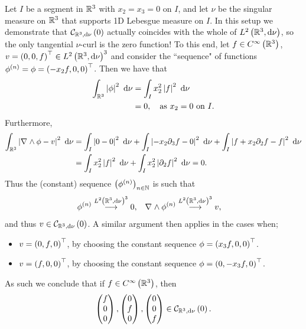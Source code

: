 Let $I$ be a segment in $\mathbb{R}^3$ with $x_2=x_3=0$ on $I$, and let $\nu$ be the singular measure on $\mathbb{R}^3$ that supports 1D Lebesgue measure on $I$.
In this setup we demonstrate that $\mathcal{C}_{ \mathbb{R}^3, \mathrm{d}\nu}\left( 0 \right)$ actually coincides with the whole of $L^{2}\left( \mathbb{R}^3,\mathrm{d}\nu \right)$, so the only tangential $\nu$-curl is the zero function!
To this end, let $f\in C^{\infty}\left( \mathbb{R}^3 \right)$, $v=\left( 0,0,f \right)^\top\in L^{2}\left( \mathbb{R}^3,\mathrm{d}\nu \right)^3$ and consider the ``sequence" of functions $\phi^{(n)}=\phi=\left( -x_2 f, 0, 0 \right)^\top$.
Then we have that
\begin{align*}
	\int_{\mathbb{R}^3}\left\lvert \phi \right\rvert^2 \ \mathrm{d}\nu &= \int_{I}x_2^2\left\lvert f \right\rvert^2 \ \mathrm{d}\nu \\
	&= 0, \quad \text{as } x_2=0 \text{ on } I.
\end{align*}
Furthermore,
\begin{align*}
	\int_{\mathbb{R}^3}\left\lvert \nabla_{}\wedge\phi - v \right\rvert^2 \ \mathrm{d}\nu &= \int_{I}\left\lvert 0-0 \right\rvert^2 \ \mathrm{d}\nu + \int_{I}\left\lvert -x_2\partial_3 f - 0 \right\rvert^2 \ \mathrm{d}\nu + \int_{I}\left\lvert f + x_2\partial_2 f - f \right\rvert^2 \ \mathrm{d}\nu \\
	&= \int_{I}x_2^2\left\lvert f \right\rvert^2 \ \mathrm{d}\nu + \int_{I}x_2^2\left\lvert \partial_2 f \right\rvert^2 \ \mathrm{d}\nu
	= 0.
\end{align*}
Thus the (constant) sequence $\left( \phi^{(n)} \right)_{n\in\mathbb{N}}$ is such that
\begin{align*}
	\phi^{(n)} \overset{L^{2}\left( \mathbb{R}^3,\mathrm{d}\nu \right)^3}{\longrightarrow} 0, &\quad \nabla_{}\wedge\phi^{(n)} \overset{L^{2}\left( \mathbb{R}^3,\mathrm{d}\nu \right)^3}{\longrightarrow} v,
\end{align*}
and thus $v\in\mathcal{C}_{ \mathbb{R}^3, \mathrm{d}\nu}\left( 0 \right)$.
A similar argument then applies in the cases when;
\begin{itemize}
	\item $v=\left( 0, f, 0 \right)^\top$, by choosing the constant sequence $\phi = \left( x_3 f, 0, 0 \right)^\top$.
	\item $v=\left( f, 0, 0 \right)^\top$, by choosing the constant sequence $\phi = \left( 0, -x_3 f, 0 \right)^\top$.
\end{itemize}
As such we conclude that if $f\in C^{\infty}\left( \mathbb{R}^3 \right)$, then
\begin{align*}
	\begin{pmatrix}	f \\ 0 \\ 0	\end{pmatrix},
	\begin{pmatrix}	0 \\ f \\ 0	\end{pmatrix},
	\begin{pmatrix}	0 \\ 0 \\ f	\end{pmatrix}
	\in \mathcal{C}_{ \mathbb{R}^3, \mathrm{d}\nu}\left( 0 \right).
\end{align*}
